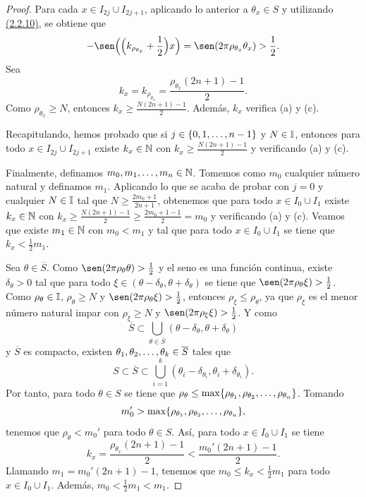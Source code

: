 \documentclass[a4paper, 12pt]{book}
\begin{document}
\begin{proof}
    Para cada $x \in I_{2j} \cup I_{2j+1}$, aplicando lo anterior a $\theta_x \in S$ y utilizando \hyperref[2.2.10]{(2.2.10)}, se obtiene que
    \[-\sen\Bigl(\Bigl(k_{\rho_{\theta_x}}+\frac{1}{2}\Bigr)x\Bigr) = \sen(2\pi\rho_{\theta_x}\theta_x) > \frac{1}{2}.\]
    Sea
    \[k_x = k_{\rho_{\theta_x}} = \frac{\rho_{\theta_x}(2n+1)-1}{2}.\] Como $\rho_{\theta_x} \geq N$, entonces $k_x \geq \frac{N(2n+1)-1}{2}$. Además, $k_x$ verifica (a) y (c). 

    Recapitulando, hemos probado que si $j \in \{0,1,\mathellipsis,n-1\}$ y $N \in \mathbb I$, entonces para todo $x \in I_{2j}\cup I_{2j+1}$ existe $k_x \in \mathbb N$ con $k_x \geq \frac{N(2n+1)-1}{2}$ y verificando (a) y (c).
    
    Finalmente, definamos $m_0,m_1,\mathellipsis,m_n\in \mathbb N$. Tomemos como $m_0$ cualquier número natural y definamos $m_1$. Aplicando lo que se acaba de probar con $j = 0$ y cualquier $N \in \mathbb I$ tal que $N \geq \frac{2m_0+1}{2n+1}$, obtenemos que para todo $x \in I_0 \cup I_1$ existe $k_x \in \mathbb N$ con $k_x \geq \frac{N(2n+1)-1}{2} \geq \frac{2m_0+1-1}{2}= m_0$ y verificando (a) y (c). Veamos que existe $m_1 \in \mathbb N$ con $m_0 < m_1$ y tal que para todo $x \in I_0\cup I_1$ se tiene que $k_x < \frac{1}{2} m_1$.

    Sea $\theta \in \overline{S}$. Como $\sen(2\pi\rho_\theta\theta) > \frac{1}{2}$ y el seno es una función continua, existe $\delta_\theta > 0$ tal que para todo ${\xi} \in (\theta-\delta_\theta,\theta+\delta_\theta)$ se tiene que $\sen(2\pi\rho_{\theta}{\xi}) > \frac{1}{2}$. Como $\rho_\theta \in \mathbb I$, $\rho_\theta \geq N$ y $\sen(2\pi\rho_\theta\xi)> \frac{1}{2}$, entonces $\rho_\xi \leq \rho_\theta$, ya que $\rho_\xi$ es el menor número natural impar con $\rho_\xi \geq N$ y $\sen(2\pi \rho_\xi\xi) > \frac{1}{2}$. Y como
    \[\overline{S} \subset \bigcup_{\theta \in \overline{S}}(\theta - \delta_\theta, \theta + \delta_\theta)\]
    y $\overline{S}$ es compacto, existen $\theta_1,\theta_2,\mathellipsis,\theta_k \in \overline{S}$ tales que
    \[S \subset \overline{S} \subset \bigcup_{i=1}^k (\theta_i-\delta_{\theta_i},\theta_i+\delta_{\theta_i}).\]
    Por tanto, para todo $\theta \in S$ se tiene que $\rho_\theta \leq \max\{\rho_{\theta_1},\rho_{\theta_2},\mathellipsis,\rho_{\theta_n}\}$. Tomando
    \[m_0' > \max \{\rho_{\theta_1},\rho_{\theta_2},\mathellipsis,\rho_{\theta_n}\},\]
    tenemos que $\rho_\theta < m_0'$ para todo $\theta \in S$. Así, para todo $x \in I_0 \cup I_1$ se tiene
    \[k_x = \frac{\rho_{\theta_x}(2n+1)-1}{2} < \frac{m_0'(2n+1)-1}{2}.\]
    Llamando $m_1 = m_0'(2n+1)-1$, tenemos que $m_0 \leq k_x < \frac{1}{2}m_1$ para todo $x \in I_0 \cup I_1$. Además, $m_0 < \frac{1}{2}m_1 < m_1$.


\end{proof}
\end{document}
